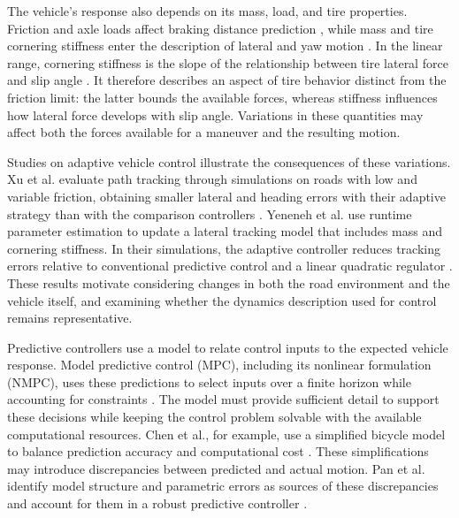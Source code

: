 \documentclass[12pt,a4paper]{report}
\begin{document}
The vehicle's response also depends on its mass, load, and tire properties. Friction and axle loads affect braking distance prediction \cite{Yun2026RealTime}, while mass and tire cornering stiffness enter the description of lateral and yaw motion \cite{Yeneneh2026Adaptive}. In the linear range, cornering stiffness is the slope of the relationship between tire lateral force and slip angle \cite{Skrickij2024Review}. It therefore describes an aspect of tire behavior distinct from the friction limit: the latter bounds the available forces, whereas stiffness influences how lateral force develops with slip angle. Variations in these quantities may affect both the forces available for a maneuver and the resulting motion.

Studies on adaptive vehicle control illustrate the consequences of these variations. Xu et al. evaluate path tracking through simulations on roads with low and variable friction, obtaining smaller lateral and heading errors with their adaptive strategy than with the comparison controllers \cite{Xu2026Parallel}. Yeneneh et al. use runtime parameter estimation to update a lateral tracking model that includes mass and cornering stiffness. In their simulations, the adaptive controller reduces tracking errors relative to conventional predictive control and a linear quadratic regulator \cite{Yeneneh2026Adaptive}. These results motivate considering changes in both the road environment and the vehicle itself, and examining whether the dynamics description used for control remains representative.



%

Predictive controllers use a model to relate control inputs to the expected vehicle response. Model predictive control (MPC), including its nonlinear formulation (NMPC), uses these predictions to select inputs over a finite horizon while accounting for constraints \cite{Su2026ReinforcementLearningBased}. The model must provide sufficient detail to support these decisions while keeping the control problem solvable with the available computational resources. Chen et al., for example, use a simplified bicycle model to balance prediction accuracy and computational cost \cite{Chen2026Hybrid}. These simplifications may introduce discrepancies between predicted and actual motion. Pan et al. identify model structure and parametric errors as sources of these discrepancies and account for them in a robust predictive controller \cite{Pan2026A}.
\end{document}
